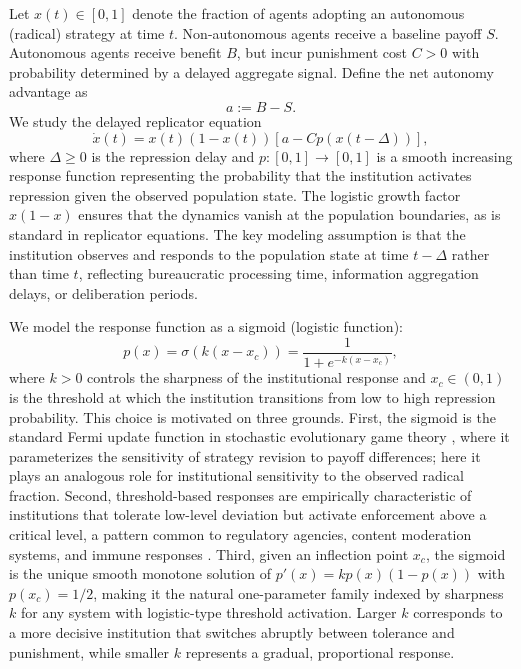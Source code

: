 Let $x(t)\in[0,1]$ denote the fraction of agents adopting an autonomous (radical) strategy at time $t$. Non-autonomous agents receive a baseline payoff $S$. Autonomous agents receive benefit $B$, but incur punishment cost $C>0$ with probability determined by a delayed aggregate signal. Define the net autonomy advantage as
\[
    a := B-S.
\]
We study the delayed replicator equation
\begin{equation}
\dot{x}(t)=x(t)(1-x(t))\left[a-Cp(x(t-\Delta))\right],
\label{eq:delayed_rep}
\end{equation}
where $\Delta\ge 0$ is the repression delay and $p\colon[0,1]\to[0,1]$ is a smooth increasing response function representing the probability that the institution activates repression given the observed population state. The logistic growth factor $x(1-x)$ ensures that the dynamics vanish at the population boundaries, as is standard in replicator equations. The key modeling assumption is that the institution observes and responds to the population state at time $t-\Delta$ rather than time $t$, reflecting bureaucratic processing time, information aggregation delays, or deliberation periods.

We model the response function as a sigmoid (logistic function):
\begin{equation}
    p(x)=\sigma(k(x-x_c))=\frac{1}{1+e^{-k(x-x_c)}},
\end{equation}
where $k>0$ controls the sharpness of the institutional response and $x_c\in(0,1)$ is the threshold at which the institution transitions from low to high repression probability. This choice is motivated on three grounds. First, the sigmoid is the standard Fermi update function in stochastic evolutionary game theory \citep{traulsen2006stochastic}, where it parameterizes the sensitivity of strategy revision to payoff differences; here it plays an analogous role for institutional sensitivity to the observed radical fraction. Second, threshold-based responses are empirically characteristic of institutions that tolerate low-level deviation but activate enforcement above a critical level, a pattern common to regulatory agencies, content moderation systems, and immune responses \citep{scheffer2009critical}. Third, given an inflection point $x_c$, the sigmoid is the unique smooth monotone solution of $p'(x)=kp(x)(1-p(x))$ with $p(x_c)=1/2$, making it the natural one-parameter family indexed by sharpness $k$ for any system with logistic-type threshold activation. Larger $k$ corresponds to a more decisive institution that switches abruptly between tolerance and punishment, while smaller $k$ represents a gradual, proportional response.

